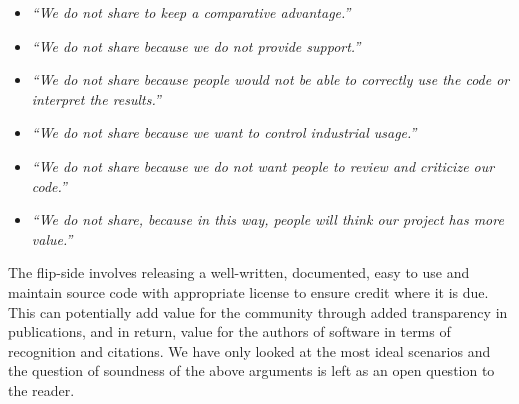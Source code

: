 %
\begin{itemize}
\item \textit{``We do not share to keep a comparative advantage.''}


\item \textit{``We do not share because we do not provide support.''}


\item \textit{``We do not share because people would not be able to
correctly use the code or interpret the results.''}



\item \textit{``We do not share because we want to control industrial usage.''}


\item \textit{``We do not share because we do not want people to review
and criticize our code.''}


\item \textit{``We do not share, because in this way, people will think our
project has more value.''}

\end{itemize}

The flip-side involves releasing a well-written, documented, easy to use and
maintain source code with appropriate license to ensure credit where it is due.
This can potentially add value for the community through added transparency in
publications, and in return, value for the authors of software in terms of
recognition and citations. We have only looked at the most ideal scenarios and
the question of soundness of the above arguments is left as an open question to
the reader.

